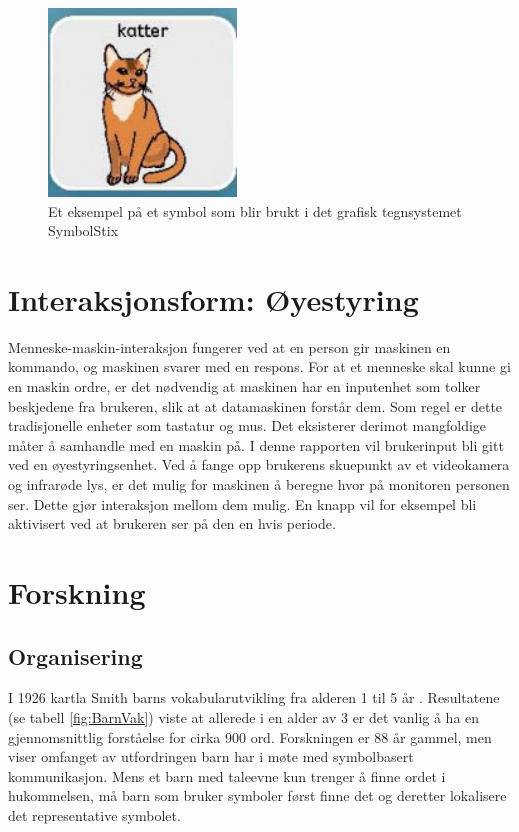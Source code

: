 \documentclass[phd,tocprelim]{cornell}
\begin{document}
\begin{figure}[ht!]
\centering
\includegraphics[width=50mm]{katt}
\caption{Et eksempel på et symbol som blir brukt i det grafisk tegnsystemet SymbolStix}
\label{fig:katt}
\end{figure}

\section{Interaksjonsform: Øyestyring}

Menneske-maskin-interaksjon fungerer ved at en person gir maskinen en kommando, og maskinen svarer med en respons. For at et menneske skal kunne gi en maskin ordre, er det nødvendig at maskinen har en inputenhet som tolker beskjedene fra brukeren, slik at at datamaskinen forstår dem.  Som regel er dette tradisjonelle enheter som tastatur og mus. Det eksisterer derimot mangfoldige måter å samhandle med en maskin på. I denne rapporten vil brukerinput bli gitt ved en øyestyringsenhet.  Ved å fange opp brukerens skuepunkt av et videokamera og infrarøde lys, er det mulig for maskinen å beregne hvor på monitoren personen ser. Dette gjør interaksjon mellom dem mulig. En knapp vil for eksempel bli aktivisert ved at brukeren ser på den en hvis periode. 




\section{Forskning}


\subsection{Organisering}


I 1926 kartla Smith\cite{Smith} barns vokabularutvikling fra alderen 1 til 5 år . Resultatene (se tabell \ref{fig:BarnVak}) viste at allerede i en alder av 3 er det vanlig å ha en gjennomsnittlig forståelse for cirka 900 ord. Forskningen er 88 år gammel, men viser omfanget av utfordringen barn har i møte med symbolbasert kommunikasjon. Mens et barn med taleevne kun trenger å finne ordet i hukommelsen, må barn som bruker symboler først finne det og deretter lokalisere det representative symbolet. 
\end{document}
